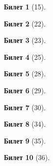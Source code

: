 \documentclass[a4paper,12pt]{article}
\newtheorem*{ticket}{Билет}
\begin{document}
	\begin{ticket}[15]
		
		\newpage
	\end{ticket}
	
	\begin{ticket}[22]
		
		\newpage
	\end{ticket}
	\begin{ticket}[23]
		
		\newpage
	\end{ticket}
	
	\begin{ticket}[25]
		
		\newpage
	\end{ticket}

	\begin{ticket}[28]
		
		\newpage
	\end{ticket}
	
	\begin{ticket}[29]
		
		\newpage
	\end{ticket}
	
	\begin{ticket}[30]
		
		\newpage
	\end{ticket}
	
	\begin{ticket}[34]
		
		\newpage
	\end{ticket}
	
	\begin{ticket}[35]
		
		\newpage
	\end{ticket}
	
	\begin{ticket}[36]
		
		\newpage
	\end{ticket}

	
	
\end{document}
